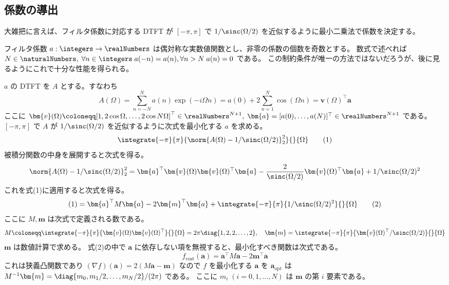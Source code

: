         \subsection{係数の導出}
            大雑把に言えば、フィルタ係数に対応する DTFT が $[-\pi,\pi]$ で $1/\sinc(\Omega/2)$ を近似するように最小二乗法で係数を決定する。
            \par
            フィルタ係数 $a:\integers\to\realNumbers$ は偶対称な実数値関数とし、非零の係数の個数を奇数とする。
            数式で述べれば $N\in\naturalNumbers,\;\forall n\in\integers\;a(-n) = a(n),\forall n>N\;a(n) = 0$ である。
            この制約条件が唯一の方法ではないだろうが、後に見るようにこれで十分な性能を得られる。
            \par
            $a$ の DTFT を $A$ とする。すなわち
            \[ A(\Omega) = \sum_{n=-N}^N a(n)\exp(-i\Omega n) = a(0) + 2\sum_{n=1}^N\cos(\Omega n) = \bm{v}(\Omega)^\top\bm{a} \]
            ここに $\bm{v}(\Omega) \coloneqq [1, 2\cos\Omega,\dots,2\cos N\Omega]^\top\in\realNumbers^{N+1},\;\bm{a} = [a(0),\dots,a(N)]^\top\in\realNumbers^{N+1}$ である。
            $[-\pi,\pi]$ で $A$ が $1/\sinc(\Omega/2)$ を近似するように次式を最小化する $a$ を求める。
            \[ \integrate{-\pi}{\pi}{\norm{A(\Omega) - 1/\sinc(\Omega/2)}_2^2}{}{\Omega} \tag{1} \]
            被積分関数の中身を展開すると次式を得る。
            \[ \norm{A(\Omega) - 1/\sinc(\Omega/2)}_2^2 = \bm{a}^\top\bm{v}(\Omega)\bm{v}(\Omega)^\top\bm{a} - \frac{2}{\sinc(\Omega/2)}\bm{v}(\Omega)^\top\bm{a} + 1/\sinc(\Omega/2)^2 \]
            これを式(1)に適用すると次式を得る。
            \[ (1) = \bm{a}^\top M\bm{a} - 2\bm{m}^\top\bm{a} + \integrate{-\pi}{\pi}{1/\sinc(\Omega/2)^2}{}{\Omega} \tag{2} \]
            ここに $M,\bm{m}$ は次式で定義される数である。
            \[ M \coloneqq \integrate{-\pi}{\pi}{\bm{v}(\Omega)\bm{v}(\Omega)^\top}{}{\Omega} = 2\pi\diag{1,2,2,\dots,2},\quad \bm{m} = \integrate{-\pi}{\pi}{\bm{v}(\Omega)^\top/\sinc(\Omega/2)}{}{\Omega} \]
            $\bm{m}$ は数値計算で求める。
            式(2)の中で $\bm{a}$ に依存しない項を無視すると、最小化すべき関数は次式である。
            \[ f_\text{cost}(\bm{a}) = \bm{a}^\top M\bm{a} - 2\bm{m}^\top\bm{a} \]
            これは狭義凸関数であり $(\nabla f)(\bm{a}) = 2(M\bm{a} - \bm{m})$ なので $f$ を最小化する $\bm{a}$ を $\bm{a}_\text{opt}$ は $M^{-1}\bm{m} = \diag{m_0,m_1 /2,\dots,m_N /2}/(2\pi)$ である。
            ここに $m_i\;(i=0,1,\dots,N)$ は $\bm{m}$ の第 $i$ 要素である。
